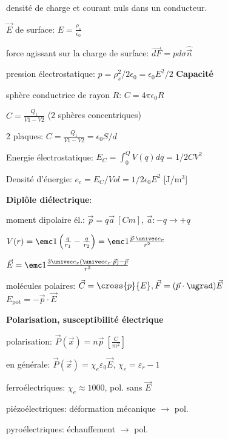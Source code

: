  

	\squishlist
		\item densité de charge et courant nuls dans un conducteur.
		\item $\vec{E}$ de surface: $E=\frac{\rho_s}{\epsilon_0}$
		\item force agissant sur la charge de surface: $\vec{dF}=pd\sigma \hat{\vec{n}}$
		\item pression électrostatique: $p = \rho_s^2/2\epsilon_0 = \epsilon_0 E^2/2$
	\squishend
\textbf{Capacité}
	\squishlist
		\item sphère conductrice de rayon $R$: $C=4\pi\epsilon_0 R$
		\item $C=\frac{Q_1}{V1-V2}$ (2 sphères concentriques)
		\item 2 plaques: $C=\frac{Q_1}{V1-V2} = \epsilon_0 S/d$
		\item Energie électrostatique: $E_C = \int_0^Q V(q)dq = 1/2 C V^2$
		\item Densité d'énergie: $e_c= E_C/Vol = 1/2 \epsilon_0 E^2$ [J/m$^3$]
	\squishend

  \squishlist
   \item \textbf{Diplôle diélectrique}:
    \squishlist
     \item moment dipolaire él.: $\vec p = q \vec a \ [Cm]$, $\vec a: -q \rightarrow +q$
     \item $V(r) = \emc 1 \left( \frac{q}{r_1} - \frac{q}{r_2} \right)
            = \emc 1 \frac{\vec p \cdot \univec e_r}{r^2}$
     \item $\vec E = \emc 1 \frac{3 \univec e_r (\univec e_r \cdot \vec p) - \vec p}{r^3}$
     \item molécules polaires: $\vec C = \cross{p}{E}, \vec F = (\vec p \cdot \ugrad) \vec E$ \\
           $E_\textrm{pot} = - \vec p \cdot \vec E$
    \squishend

   \item \textbf{Polarisation, susceptibilité électrique}
    \squishlist
     \item polarisation: $\vec P (\vec x) = n \vec p \ [\frac{C}{m^2}]$
     \item en générale: $\vec P(\vec x) = \chi_e \varepsilon_0 \vec E$,
           $\chi_e = \varepsilon_r - 1$
     \item ferroélectriques: $\chi_e \approx 1000$, pol. sans $\vec E$
     \item piézoélectriques: déformation mécanique $\rightarrow$ pol.
     \item pyroélectriques: échauffement $\rightarrow$ pol.
    \squishend

